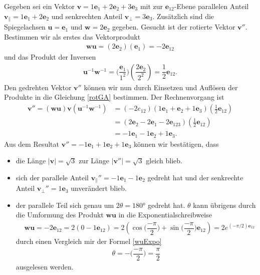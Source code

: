 \begin{beispiel} 
	Gegeben sei ein Vektor $\mathbf{v} = 1\mathbf{e}_1 + 2\mathbf{e}_2 + 3\mathbf{e}_3$ mit zur $\mathbf{e}_{12}$-Ebene parallelen Anteil $\mathbf{v_\parallel} = 1\mathbf{e}_1 + 2\mathbf{e}_2$ und senkrechten Anteil $\mathbf{v_\perp} = 3\mathbf{e}_3$. Zusätzlich sind die Spiegelachsen $\mathbf{u} = \mathbf{e}_1$ und $\mathbf{w} = 2\mathbf{e}_2$ gegeben. Gesucht ist der rotierte Vektor $\mathbf{v}''$. Bestimmen wir als erstes das Vektorprodukt
	\begin{align}
	\mathbf{wu} = (2\mathbf{e}_2)(\mathbf{e}_1) = -2\mathbf{e}_{12}
	\end{align}
	und das Produkt der Inversen
	\begin{align}
	\mathbf{u}^{-1}\mathbf{w}^{-1} = \biggl(\dfrac{\mathbf{e}_1}{1^2}\biggr) \left(\dfrac{2\mathbf{e}_2}{2^2}\right) = \dfrac{1}{2}\mathbf{e}_{12}.
	\end{align}
	Den gedrehten Vektor $\mathbf{v}''$ können wir nun durch Einsetzen und Auflösen der Produkte in die Gleichung \eqref{rotGA} bestimmen. Der Rechnenvorgang ist
	\begin{align}
	\mathbf{v}'' = (\mathbf{wu})\mathbf{v}(\mathbf{u}^{-1}\mathbf{w}^{-1}) &= (-2e_{12})(1\mathbf{e}_1 + \mathbf{e}_2 + 1\mathbf{e}_3)(\textstyle{\frac{1}{2}}\mathbf{e}_{12})\\
	&= (2\mathbf{e}_2-2\mathbf{e}_1-2\mathbf{e}_{123})(\textstyle{\frac{1}{2}}\mathbf{e}_{12})\\
	&= -1\mathbf{e}_1 - 1\mathbf{e}_2 + 1\mathbf{e}_3.
	\end{align}
	Aus dem Resultat $\mathbf{v}''= -1\mathbf{e}_1 + 1\mathbf{e}_2 + 1\mathbf{e}_3$ können wir bestätigen, dass
	\begin{itemize}
		\item die Länge $|\mathbf{v}| = \sqrt{3}$ zur Länge $|\mathbf{v}''|=\sqrt{3}$ gleich blieb.
		\item sich der parallele Anteil $\mathbf{v_\parallel}'' = -1\mathbf{e}_1 - 1\mathbf{e}_2$ gedreht hat und der senkrechte Anteil $\mathbf{v_\perp}'' = 1\mathbf{e}_3$ unverändert blieb.
		\item der parallele Teil sich genau um $2\theta=180$° gedreht hat. $\theta$ kann übrigens durch die Umformung des Produkt $\mathbf{wu}$ in die Exponentialschreibweise
		\begin{align}
		&\mathbf{wu} = -2\mathbf{e}_{12} = 2(0-1\mathbf{e}_{12})=2(\cos\biggl(\dfrac{-\pi}{2}\biggr) + \sin\biggl(\dfrac{-\pi}{2}\biggr)\mathbf{e}_{12}) = 2e^{(-\pi/2)\mathbf{e}_{12}}
		\end{align}
		durch einen Vergleich mir der Formel \eqref{wuExpo}
		\begin{align}
		\theta = -\biggl(\dfrac{-\pi}{2}\biggr) = \dfrac{\pi}{2}
		\end{align}
		ausgelesen werden. \qedhere
	\end{itemize}
\end{beispiel} 